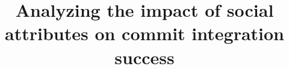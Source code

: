 \documentclass[10pt, conference]{IEEEtran}
\begin{document}
%

\title{Analyzing the impact of social attributes on commit integration success}



\author{
\IEEEauthorblockA{\\
\\
\\}

}


% 
\end{document}
